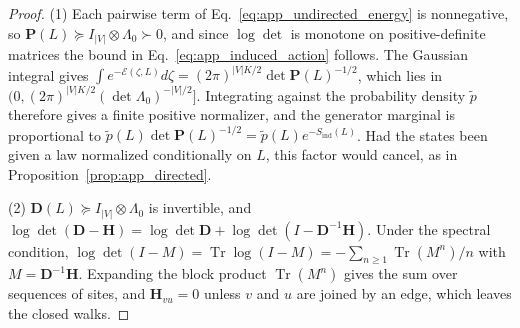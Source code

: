 \documentclass[twoside,11pt]{article}
\begin{document}
\begin{proof}
(1) Each pairwise term of Eq.~\eqref{eq:app_undirected_energy} is nonnegative, so $\mathbf P(L)\succeq I_{|V|}\otimes\Lambda_0\succ0$, and since $\log\det$ is monotone on positive-definite matrices the bound in Eq.~\eqref{eq:app_induced_action} follows. The Gaussian integral gives $\int e^{-\mathcal E(\zeta,L)}d\zeta=(2\pi)^{|V|K/2}\det\mathbf P(L)^{-1/2}$, which lies in $(0,(2\pi)^{|V|K/2}(\det\Lambda_0)^{-|V|/2}]$. Integrating against the probability density $\tilde p$ therefore gives a finite positive normalizer, and the generator marginal is proportional to $\tilde p(L)\det\mathbf P(L)^{-1/2}=\tilde p(L)e^{-S_{\mathrm{ind}}(L)}$. Had the states been given a law normalized conditionally on $L$, this factor would cancel, as in Proposition~\ref{prop:app_directed}.

(2) $\mathbf D(L)\succeq I_{|V|}\otimes\Lambda_0$ is invertible, and $\log\det(\mathbf D-\mathbf H)=\log\det\mathbf D+\log\det(I-\mathbf D^{-1}\mathbf H)$. Under the spectral condition, $\log\det(I-M)=\operatorname{Tr}\log(I-M)=-\sum_{n\ge1}\operatorname{Tr}(M^n)/n$ with $M=\mathbf D^{-1}\mathbf H$. Expanding the block product $\operatorname{Tr}(M^n)$ gives the sum over sequences of sites, and $\mathbf H_{vu}=0$ unless $v$ and $u$ are joined by an edge, which leaves the closed walks.


\end{proof}
\end{document}
